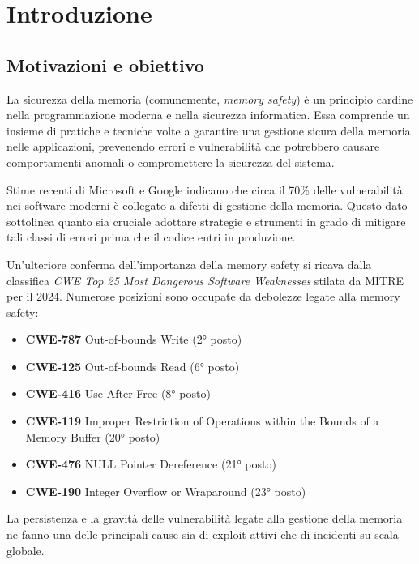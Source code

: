 \chapter{Introduzione}
\label{cha:introduction_new}

\section{Motivazioni e obiettivo}
La sicurezza della memoria (comunemente, \textit{memory safety}) è un principio
cardine nella programmazione moderna e nella sicurezza informatica. Essa comprende
un insieme di pratiche e tecniche volte a garantire una gestione sicura della memoria
nelle applicazioni, prevenendo errori e vulnerabilità che potrebbero causare
comportamenti anomali o compromettere la sicurezza del sistema.

Stime recenti di Microsoft\cite{microsoft_proactive_approach} e Google\cite{chromium_memory_safety}
indicano che circa il 70\% delle vulnerabilità nei software moderni è collegato a
difetti di gestione della memoria. Questo dato sottolinea quanto sia cruciale
adottare strategie e strumenti in grado di mitigare tali classi di errori prima
che il codice entri in produzione.

Un'ulteriore conferma dell'importanza della memory safety si ricava dalla
classifica \textit{CWE Top 25 Most Dangerous Software Weaknesses}\cite{cwe_top25_2024}
stilata da MITRE per il 2024. Numerose posizioni sono occupate da debolezze
legate alla memory safety:
\begin{itemize}
  \item \textbf{CWE-787} Out-of-bounds Write (2° posto)

  \item \textbf{CWE-125} Out-of-bounds Read (6° posto)

  \item \textbf{CWE-416} Use After Free (8° posto)

  \item \textbf{CWE-119} Improper Restriction of Operations within the Bounds of
    a Memory Buffer (20° posto)

  \item \textbf{CWE-476} NULL Pointer Dereference (21° posto)

  \item \textbf{CWE-190} Integer Overflow or Wraparound (23° posto)
\end{itemize}
La persistenza e la gravità delle vulnerabilità legate alla gestione della memoria
ne fanno una delle principali cause sia di exploit attivi che di incidenti su scala
globale.

